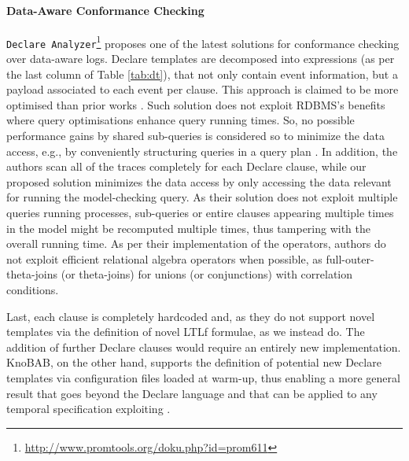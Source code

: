 \paragraph*{Data-Aware Conformance Checking}
\texttt{Declare Analyzer}\footnote{\url{http://www.promtools.org/doku.php?id=prom611}} \cite{BurattinMS16} proposes one of the latest solutions for conformance checking over data-aware logs. Declare templates are decomposed into \LTLf expressions (as per the last column of Table \ref{tab:dt}), that not only contain event information, but a payload associated to each event per clause. 
This approach is claimed to be  more optimised than prior works \cite{VanDerAalst2005}.  
Such solution
does not exploit RDBMS's 
benefits %
where %
query optimisations enhance query running times. 
So, no possible performance gains by shared sub-queries 
is considered so to minimize the data access, e.g., by conveniently 
structuring queries in a query plan \cite{BellatrecheKB21}. 
In addition, the authors
scan all of the traces completely for each Declare clause, while our proposed solution minimizes the data access by only accessing the data relevant for running the model-checking query. 
As their solution does not exploit multiple queries running processes, sub-queries or entire clauses appearing multiple times in the model might be recomputed multiple times, thus tampering with the overall running time.
As per their implementation of the \LTLf operators, authors do not exploit efficient relational algebra operators when possible, as full-outer-theta-joins (or theta-joins) for unions (or conjunctions) with correlation conditions.

Last, each clause is completely hardcoded and, as they do not support novel templates via the definition of novel LTLf formulae, as we instead do. The addition of further Declare clauses would require an entirely new implementation. KnoBAB, on the other hand, supports the definition of potential new Declare templates via configuration files loaded at warm-up, %
thus enabling a more general result that goes beyond the Declare language and that can be applied to any temporal specification exploiting \LTLf.




